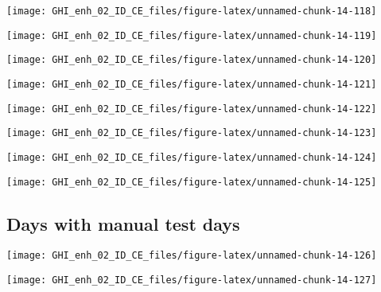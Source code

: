 \documentclass[
  10pt,
  a4paper,oneside]{article}
\begin{document}
\begin{center}\texttt{[image: GHI\_enh\_02\_ID\_CE\_files/figure-latex/unnamed-chunk-14-118]} \end{center}

\begin{center}\texttt{[image: GHI\_enh\_02\_ID\_CE\_files/figure-latex/unnamed-chunk-14-119]} \end{center}

\begin{center}\texttt{[image: GHI\_enh\_02\_ID\_CE\_files/figure-latex/unnamed-chunk-14-120]} \end{center}

\begin{center}\texttt{[image: GHI\_enh\_02\_ID\_CE\_files/figure-latex/unnamed-chunk-14-121]} \end{center}

\begin{center}\texttt{[image: GHI\_enh\_02\_ID\_CE\_files/figure-latex/unnamed-chunk-14-122]} \end{center}

\begin{center}\texttt{[image: GHI\_enh\_02\_ID\_CE\_files/figure-latex/unnamed-chunk-14-123]} \end{center}

\begin{center}\texttt{[image: GHI\_enh\_02\_ID\_CE\_files/figure-latex/unnamed-chunk-14-124]} \end{center}

\begin{center}\texttt{[image: GHI\_enh\_02\_ID\_CE\_files/figure-latex/unnamed-chunk-14-125]} \end{center}

\FloatBarrier

\hypertarget{days-with-manual-test-days}{%
\subsection{Days with manual test days}\label{days-with-manual-test-days}}

\begin{center}\texttt{[image: GHI\_enh\_02\_ID\_CE\_files/figure-latex/unnamed-chunk-14-126]} \end{center}

\begin{center}\texttt{[image: GHI\_enh\_02\_ID\_CE\_files/figure-latex/unnamed-chunk-14-127]} \end{center}
\end{document}
